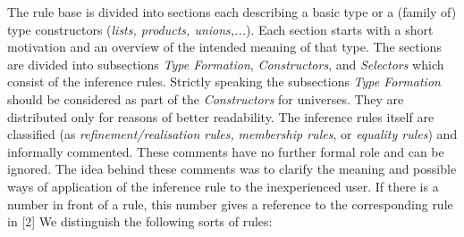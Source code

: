 \documentclass[11pt]{report}
\begin{document}
 The rule base is divided into sections each describing a 
 basic type or a (family of) type constructors
 (\emph{lists, products, unions,...}).
 Each section starts with a short motivation
 and an overview of the intended meaning of that type.
 The sections are divided into subsections 
 \emph{Type Formation}, \emph{Constructors}, and \emph{ Selectors}
 which consist of the inference rules. 
 Strictly speaking the subsections \emph{Type Formation} should
 be considered as part of the \emph{Constructors} for universes.
 They are distributed only for reasons of better readability.
 The inference rules itself are classified 
 (as \emph{refinement/realisation rules,}
 \emph{ membership rules}, or \emph{ equality rules}) and 
 informally commented. These comments have
 no further formal role and can be ignored. The idea behind these
 comments was to clarify the meaning and possible ways of
 application of the inference rule to the inexperienced
 user. If there is a number in front of a rule, this number
 gives a reference to the corresponding rule in [2]
 We distinguish the following sorts of rules:
\end{document}
